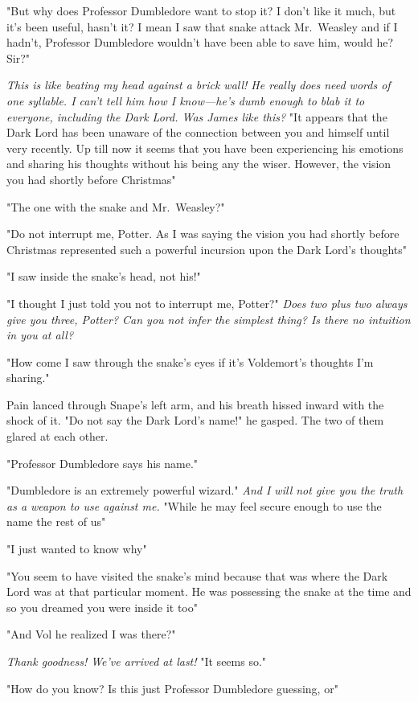 "But why does Professor Dumbledore want to stop it? I don't like it much, but it's been useful, hasn't it? I mean{\el} I saw that snake attack Mr.~Weasley and if I hadn't, Professor Dumbledore wouldn't have been able to save him, would he? Sir?"

\emph{This is like beating my head against a brick wall! He really does need words of one syllable. I can't tell him how I know—he's dumb enough to blab it to everyone, including the Dark Lord. Was James like this?} "It appears that the Dark Lord has been unaware of the connection between you and himself until very recently. Up till now it seems that you have been experiencing his emotions and sharing his thoughts without his being any the wiser. However, the vision you had shortly before Christmas{\el}"

"The one with the snake and Mr.~Weasley?"

"Do not interrupt me, Potter. As I was saying{\el} the vision you had shortly before Christmas represented such a powerful incursion upon the Dark Lord's thoughts{\el}"

"I saw inside the snake's head, not his!"

"I thought I just told you not to interrupt me, Potter?" \emph{Does two plus two always give you three, Potter? Can you not infer the simplest thing? Is there no intuition in you at all?}

"How come I saw through the snake's eyes if it's Voldemort's thoughts I'm sharing."

Pain lanced through Snape's left arm, and his breath hissed inward with the shock of it. "Do not say the Dark Lord's name!" he gasped. The two of them glared at each other.

"Professor Dumbledore says his name."

"Dumbledore is an extremely powerful wizard." \emph{And I will not give you the truth as a weapon to use against me.} "While he may feel secure enough to use the name{\el} the rest of us{\el}"

"I just wanted to know why{\el}"

"You seem to have visited the snake's mind because that was where the Dark Lord was at that particular moment. He was possessing the snake at the time and so you dreamed you were inside it too{\el}"

"And Vol{\el} he{\el} realized I was there?"

\emph{Thank goodness! We've arrived at last!} "It seems so."

"How do you know? Is this just Professor Dumbledore guessing, or{\el}"

